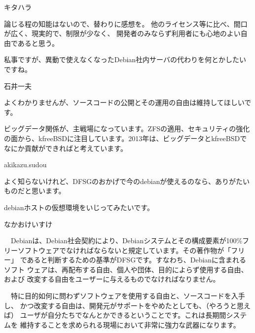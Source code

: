 \begin{prework}{ キタハラ }

 論じる程の知能はないので、替わりに感想を。
他のライセンス等に比べ、間口が広く、現実的で、制限が少なく、
開発者のみならず利用者にも心地のよい自由であると思う。

 私事ですが、異動で使えなくなったDebian社内サーバの代わりを何とかしたいですね。
\end{prework}

\begin{prework}{ 石井一夫 }


よくわかりませんが、ソースコードの公開とその運用の自由は維持してほしいです。


ビッグデータ関係が、主戦場になっています。ZFSの適用、セキュリティの強化の面から、kfreeBSDに注目しています。2013年は、ビッグデータとkfreeBSDでなにか貢献ができればと考えています。
\end{prework}

\begin{prework}{ akikazu.sudou }


よく知らないけれど、DFSGのおかげで今のdebianが使えるのなら、ありがたいものだと思います。

debianホストの仮想環境をいじってみたいです。

\end{prework}

\begin{prework}{ なかおけいすけ }

　Debianは、Debian社会契約により、Debianシステムとその構成要素が100\%フ
 リーソフトウェアでなければならないと規定しています。その著作物が「フリー」
 であると判断するための基準がDFSGです。すなわち、Debianに含まれるソフト
 ウェアは、再配布する自由、個人や団体、目的によらず使用する自由、および
 改変する自由をユーザーに与えるものでなければなりません。

　特に目的如何に問わずソフトウェアを使用する自由と、ソースコードを入手し、
 かつ改変する自由は、開発元がサポートをやめたとしても、（やろうと思えば）
 ユーザが自分たちでなんとかできるということです。これは長期間システムを
 維持することを求められる現場において非常に強力な武器になります。

\end{prework}

